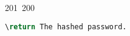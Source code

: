 201~200~\documentclass{article}
\begin{document}
\begin{lstlisting}[language=Python, caption=Server Password Hashing with SHA3-512]
	                                                                                                                                                                                                                                                                                                	                                                                                                                                        	    	                                                                                                	                                                                                                                                                                                                                                                                                                                                	                                                                        	                                                                        	                                                                                                                                        	                                                                                                        \return The hashed password.
	                                                                                                                                                                                                                                                                                                	                                                                                                                                        	    	                                                                                                	                                                                                                                                                                                                                                                                                                                                	                                                                        	                                                                        	                                                                                                                                        	                                                                                                            """

\end{lstlisting}
\end{document}
